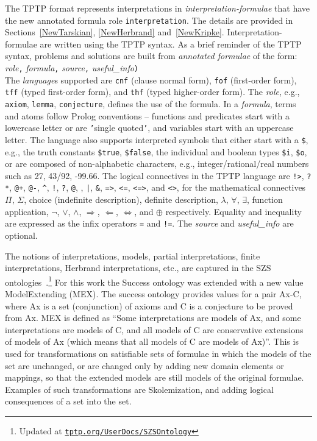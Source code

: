 \documentclass{ceurart}
\newcommand{\smalltt}[1]{\small \texttt{#1}}
\newcommand{\tildenot}{\raisebox{0.4ex}{\texttildelow}}
\begin{document}
The TPTP format represents interpretations in \emph{interpretation-formulae} that have the new
annotated formula role \smalltt{interpretation}.
The details are provided in Sections~\ref{NewTarskian}, \ref{NewHerbrand} and~\ref{NewKripke}.
Interpretation-formulae are written using the TPTP syntax.
As a brief reminder of the TPTP syntax, problems and solutions are built from 
{\em annotated formulae} of the form: \\
{\em role}{\tt ,}
{\em formula}{\tt ,}
{\em source}{\tt ,}
{\em useful\_info}{\tt )} \\
The {\em language}s supported are \smalltt{cnf} (clause normal form), \smalltt{fof}
(first-order form), \smalltt{tff} (typed first-order form), and \smalltt{thf}
(typed higher-order form).
The {\em role}, e.g., \smalltt{axiom}, \smalltt{lemma}, \smalltt{conjecture}, defines the 
use of the formula.
In a {\em formula}, terms and atoms follow Prolog conventions -- functions and predicates start 
with a lowercase letter or are {\tt '}single quoted{\tt '}, and variables start with an uppercase 
letter.
The language also supports interpreted symbols that either start with a {\tt \$}, e.g., the 
truth constants \smalltt{\$true}, \smalltt{\$false}, the individual and boolean
types \smalltt{\$i}, \smalltt{\$o}, or are composed of 
non-alphabetic characters, e.g., integer/rational/real numbers such as 27, 43/92, -99.66.
The logical connectives in the TPTP language are
{\tt !>}, {\tt ?*}, {\tt @+}, {\tt @-}, {\tt \verb|^|}, {\tt !}, {\tt ?}, {\tt @}, 
{\tt {\tildenot}}, {\tt |}, {\tt \&}, {\tt =>}, {\tt <=}, {\tt <=>}, and {\tt <{\tildenot}>}, 
for the mathematical 
connectives $\Pi$, $\Sigma$, choice (indefinite description), definite description, $\lambda$,
$\forall$, $\exists$, function application, $\neg$, $\vee$, $\wedge$, $\Rightarrow$, $\Leftarrow$, 
$\Leftrightarrow$, and $\oplus$ respectively.
Equality and inequality are expressed as the infix operators {\tt =} and {\tt !=}.
The {\em source} and {\em useful\_info} are optional.

The notions of interpretations, models, partial interpretations, finite interpretations,
Herbrand interpretations, etc., are captured in the SZS 
ontologies~\cite{Sut08-KEAPPA}.\footnote{%
Updated at
\href{https://tptp.org/UserDocs/SZSOntology/}{\tt tptp.org/UserDocs/SZSOntology}}
For this work the Success ontology was extended with a new value ModelExtending (MEX).
The success ontology provides values for a pair Ax-C, where Ax is a set (conjunction) of axioms 
and C is a conjecture to be proved from Ax. 
MEX is defined as ``Some interpretations are models of Ax, and some interpretations are models 
of C, and all models of C are conservative extensions of models of Ax (which means that all 
models of C are models of Ax)''.
This is used for transformations on satisfiable sets of formulae in which the models of the set 
are unchanged, or are changed only by adding new domain elements or mappings, so that the
extended models are still models of the original formulae. 
Examples of such transformations are Skolemization, and adding logical consequences of a set 
into the set.
\end{document}
